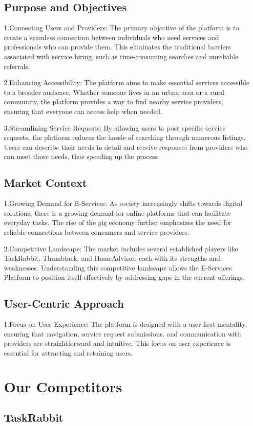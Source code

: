 \documentclass[12pt,a4paper]{report}
\begin{document}
\section{Purpose and Objectives}
1.Connecting Users and Providers: The primary objective of the platform is to create a seamless connection between individuals who need services and professionals who can provide them. This eliminates the traditional barriers associated with service hiring, such as time-consuming searches and unreliable referrals.

2.Enhancing Accessibility: The platform aims to make essential services accessible to a broader audience. Whether someone lives in an urban area or a rural community, the platform provides a way to find nearby service providers, ensuring that everyone can access help when needed.

3.Streamlining Service Requests: By allowing users to post specific service requests, the platform reduces the hassle of searching through numerous listings. Users can describe their needs in detail and receive responses from providers who can meet those needs, thus speeding up the process
\section{Market Context}
1.Growing Demand for E-Services: As society increasingly shifts towards digital solutions, there is a growing demand for online platforms that can facilitate everyday tasks. The rise of the gig economy further emphasizes the need for reliable connections between consumers and service providers.

2.Competitive Landscape: The market includes several established players like TaskRabbit, Thumbtack, and HomeAdvisor, each with its strengths and weaknesses. Understanding this competitive landscape allows the E-Services Platform to position itself effectively by addressing gaps in the current offerings.
\section{User-Centric Approach}
1.Focus on User Experience: The platform is designed with a user-first mentality, ensuring that navigation, service request submissions, and communication with providers are straightforward and intuitive. This focus on user experience is essential for attracting and retaining users.

\chapter{Our Competitors}
\section{TaskRabbit}
\end{document}
